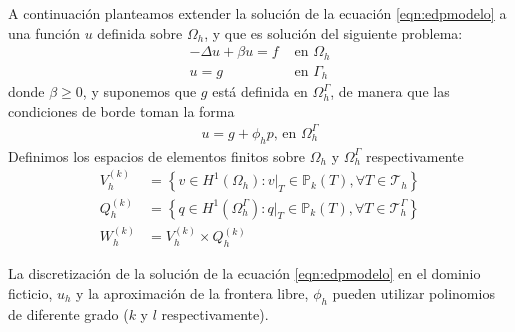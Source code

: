 A continuación planteamos extender la solución de la ecuación \ref{eqn:edpmodelo} a una función $u$ definida sobre $\Omega_h$, y que es solución del siguiente problema:
\begin{align}
	-\Delta u+\beta u  = f &\text{ en }  \Omega_h\\
	u = g& \text{ en } \Gamma_h
\end{align}
donde $\beta\geq 0$, y suponemos que $g$ está definida en $\Omega^\Gamma_h$, de manera que las condiciones de borde toman la forma 
\begin{align}
	u = g + \phi_h p\text{, en } \Omega^\Gamma_h
\end{align}
%
Definimos los espacios de elementos finitos sobre $\Omega_h$ y $\Omega_h^\Gamma$ respectivamente
\begin{align}
	V_h^{(k)}&= \left\{ v \in H^1(\Omega_h):\left.v\right\vert_T \in \mathbb{P}_k(T),\forall T \in \mathcal{T}_h\right\}\\
	Q_h^{(k)}&= \left\{ q \in H^1(\Omega_h^\Gamma):\left.q\right\vert_T \in \mathbb{P}_k(T),\forall T \in \mathcal{T}_h^\Gamma\right\}\\
	W_h^{(k)}&=	V_h^{(k)}	\times 	Q_h^{(k)}
\end{align}

La discretización de la solución de la  ecuación  \ref{eqn:edpmodelo} en el dominio ficticio, $u_h$ y la aproximación de la frontera libre, $\phi_h$ pueden utilizar polinomios de diferente grado ($k$ y $l$ respectivamente).


